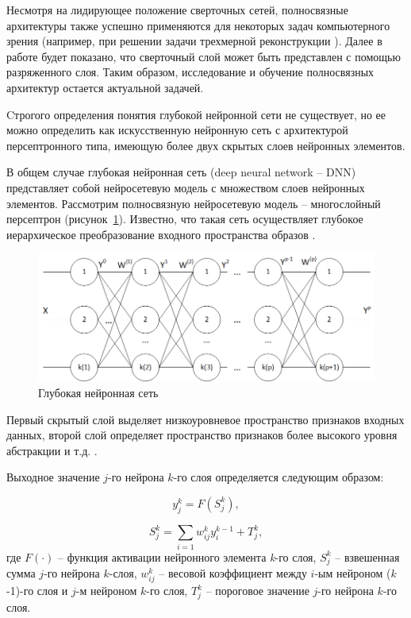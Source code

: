 Несмотря на лидирующее положение сверточных сетей, полносвязные архитектуры также успешно применяются для некоторых задач компьютерного зрения (например, при решении задачи трехмерной реконструкции \cite{mildenhall2020nerf}). Далее в работе будет показано, что сверточный слой может быть представлен с помощью разряженного слоя. Таким образом, исследование и обучение полносвязных архитектур остается актуальной задачей. 

Cтрогого определения понятия глубокой нейронной сети не существует, но ее можно определить как искусственную нейронную сеть с архитектурой персептронного типа, имеющую более двух скрытых слоев нейронных элементов.

В общем случае глубокая нейронная сеть (deep neural network -- DNN) представляет собой нейросетевую модель с множеством слоев нейронных элементов. Рассмотрим полносвязную нейросетевую модель -- многослойный персептрон (рисунок~\ref{fig:pic1_1}). Известно, что такая сеть осуществляет глубокое иерархическое преобразование входного пространства образов \cite{n5}. 

\begin{figure}[H]
  \centering
  \includegraphics[width=\textwidth]{man-source/images/ch1/pic1-1.png}
  \caption{Глубокая нейронная сеть}
  \label{fig:pic1_1}
\end{figure}

Первый скрытый слой выделяет низкоуровневое пространство признаков входных данных, второй слой определяет пространство признаков более высокого уровня абстракции и т.д. \cite{n3}. 

Выходное значение $j$-го нейрона $k$-го слоя определяется следующим образом:

\begin{equation}
y_j^k=F(S_j^k),
\end{equation}

\begin{equation}
S_j^k=\sum_{i=1} w_{ij}^ky_i^{k-1}+T_j^k,
\end{equation}
где $F(\cdot)$ -- функция активации нейронного элемента \textit{k}-го слоя, $S_j^k$ -- взвешенная сумма $j$-го нейрона $k$-слоя, $w_{ij}^k$ -- весовой коэффициент между $i$-ым нейроном ($k$-1)-го слоя и $j$-м нейроном $k$-го слоя, $T_j^k$ -- пороговое значение $j$-го нейрона $k$-го слоя.

